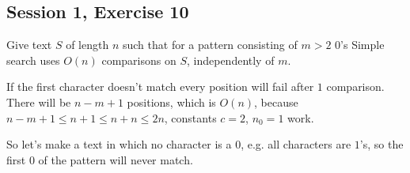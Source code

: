 \subsection{Session 1, Exercise 10}


Give text $S$ of length $n$ such that for a pattern consisting of $m>2$ $0$'s Simple search uses $O(n)$ comparisons on $S$, independently of $m$.


If the first character doesn't match every position will fail after $1$ comparison. There will be $n-m+1$ positions, which is $O(n)$, because $n-m+1 \leq{} n+1 \leq{} n+n \leq{} 2n$, constants $c=2$, $n_0=1$ work.

So let's make a text in which no character is a $0$, e.g. all characters are $1$'s, so the first $0$ of the pattern will never match.